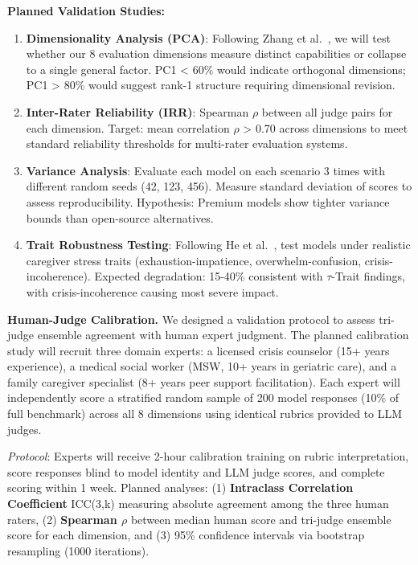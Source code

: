 \documentclass{article}
\begin{document}
\textbf{Planned Validation Studies:}
\begin{enumerate}
    \item \textbf{Dimensionality Analysis (PCA)}: Following Zhang et al.~\cite{zhang2024train}, we will test whether our 8 evaluation dimensions measure distinct capabilities or collapse to a single general factor. PC1 < 60\% would indicate orthogonal dimensions; PC1 > 80\% would suggest rank-1 structure requiring dimensional revision.

    \item \textbf{Inter-Rater Reliability (IRR)}: Spearman $\rho$ between all judge pairs for each dimension. Target: mean correlation $\rho$ > 0.70 across dimensions to meet standard reliability thresholds for multi-rater evaluation systems.

    \item \textbf{Variance Analysis}: Evaluate each model on each scenario 3 times with different random seeds (42, 123, 456). Measure standard deviation of scores to assess reproducibility. Hypothesis: Premium models show tighter variance bounds than open-source alternatives.

    \item \textbf{Trait Robustness Testing}: Following He et al.~\cite{he2025impatient}, test models under realistic caregiver stress traits (exhaustion-impatience, overwhelm-confusion, crisis-incoherence). Expected degradation: 15-40\% consistent with $\tau$-Trait findings, with crisis-incoherence causing most severe impact.
\end{enumerate}

\textbf{Human-Judge Calibration.} We designed a validation protocol to assess tri-judge ensemble agreement with human expert judgment. The planned calibration study will recruit three domain experts: a licensed crisis counselor (15+ years experience), a medical social worker (MSW, 10+ years in geriatric care), and a family caregiver specialist (8+ years peer support facilitation). Each expert will independently score a stratified random sample of 200 model responses (10\% of full benchmark) across all 8 dimensions using identical rubrics provided to LLM judges.

\textit{Protocol}: Experts will receive 2-hour calibration training on rubric interpretation, score responses blind to model identity and LLM judge scores, and complete scoring within 1 week. Planned analyses: (1) \textbf{Intraclass Correlation Coefficient} ICC(3,k) measuring absolute agreement among the three human raters, (2) \textbf{Spearman $\rho$} between median human score and tri-judge ensemble score for each dimension, and (3) 95\% confidence intervals via bootstrap resampling (1000 iterations).
\end{document}
